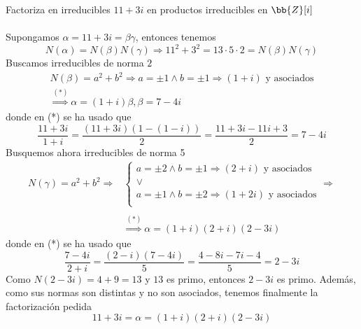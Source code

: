 \documentclass[12pt]{article}
\newcommand{\im}{\mathit}
\begin{document}
    \begin{ejercicio} [1,25 puntos]
        Factoriza en irreducibles $11+3\mathit{i}$ en productos irreducibles en $\bb{Z}[i]$ \\ \\
        Supongamos $\alpha=11+3\mathit{i}=\beta\gamma$, entonces tenemos
        \begin{equation*}
            N(\alpha)=N(\beta)N(\gamma)\Longrightarrow11^2+3^2=13\cdot5\cdot2=N(\beta)N(\gamma)
        \end{equation*}
        Buscamos irreducibles de norma $2$
        \begin{multline*}
            N(\beta)=a^2+b^2\Longrightarrow a=\pm 1 \wedge b=\pm 1\Longrightarrow (1+i)\text{ y asociados}\\
            \overset{(*)}\Longrightarrow \alpha=(1+\mathit{i})\beta, \beta=7-4\mathit{i}
        \end{multline*}
        donde en (*) se ha usado que
        \begin{equation*}
            \frac{11+3\im{i}}{1+i}=\frac{(11+3\im{i})(1-\im{(1-i)})}{2}=\frac{11+3\im{i}-11\im{i}+3}{2}=7-4\im{i}
        \end{equation*}
        Busquemos ahora irreducibles de norma 5
        \begin{align*}
            N(\gamma)=a^2+b^2\Longrightarrow &\left\{\begin{array}{c}
                a=\pm2 \wedge b=\pm1\Longrightarrow(2+\im{i}) \text{ y asociados} \\
                \vee \\
                a=\pm1 \wedge b=\pm2\Longrightarrow(1+2\im{i}) \text{ y asociados} \\
            \end{array}\right. \Longrightarrow \\
            \\
            &\overset{(*)}\Longrightarrow \alpha=(1+\im{i})(2+\im{i})(2-3\im{i})
        \end{align*}
        donde en (*) se ha usado que
        \begin{equation*}
            \frac{7-4\im{i}}{2+\im{i}}=\frac{(2-\im{i})(7-4\im{i})}{5}=\frac{4-8\im{i}-7\im{i}-4}{5}=2-3\im{i}
        \end{equation*}
        Como $N(2-3\im{i})=4+9=13$ y $13$ es primo, entonces $2-3\im{i}$ es primo. Además, como sus  normas son distintas y no son asociados, tenemos finalmente la factorización pedida
        \begin{equation*}
            11+3\im{i}=\alpha=(1+\im{i})(2+\im{i})(2-3\im{i})
        \end{equation*}
    \end{ejercicio}
\end{document}
